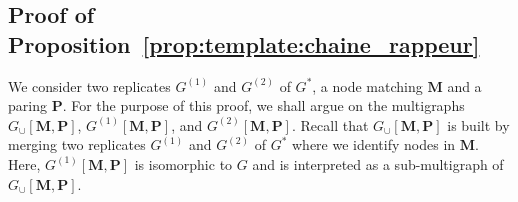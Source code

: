 \documentclass{article}
\begin{document}
    
    
    






\subsection{Proof of Proposition~\ref{prop:template:chaine_rappeur}}
We consider  two replicates $G^{(1)}$ and $G^{(2)}$ of $G^*$, a node matching $\mathbf{M}$ and a paring $\mathbf{P}$.  For the purpose of this proof, we shall argue on the multigraphs $G_{\cup}[\mathbf{M},\mathbf{P}]$, $G^{(1)}[\mathbf{M},\mathbf{P}]$, and $G^{(2)}[\mathbf{M},\mathbf{P}]$. Recall that $G_{\cup}[\mathbf{M},\mathbf{P}]$ is built by  merging two replicates $G^{(1)}$ and $G^{(2)}$ of $G^*$ where we identify nodes in $\mathbf{M}$. Here, $G^{(1)}[\mathbf{M},\mathbf{P}]$ is isomorphic to $G$ and is interpreted as a sub-multigraph of $G_{\cup}[\mathbf{M},\mathbf{P}]$.
\end{document}
